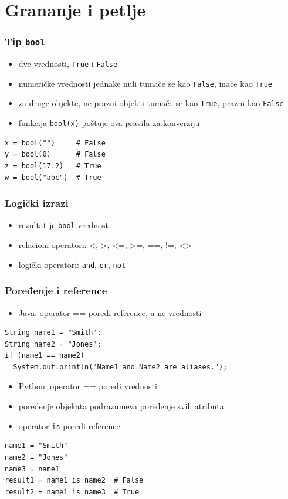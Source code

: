 \documentclass[compress]{beamer}
\begin{document}
\section[Kontrola toka]{Grananje i petlje}

\begin{frame}[fragile]
\frametitle{Tip \texttt{bool}}
\begin{itemize}
  \item dve vrednosti, \texttt{True} i \texttt{False}
  \item numeričke vrednosti jednake nuli tumače se kao \texttt{False}, inače kao \texttt{True}
  \item za druge objekte, ne-prazni objekti tumače se kao \texttt{True}, prazni kao \texttt{False}
  \item funkcija \texttt{bool(x)} poštuje ova pravila za konverziju
\end{itemize}
\begin{verbatim}
x = bool("")     # False
y = bool(0)      # False
z = bool(17.2)   # True
w = bool("abc")  # True
\end{verbatim}
\end{frame}

\begin{frame}[fragile]
\frametitle{Logički izrazi}
\begin{itemize}
  \item rezultat je \texttt{bool} vrednost
  \item relacioni operatori: <, >, <=, >=, ==, !=, <>
  \item logički operatori: \texttt{and}, \texttt{or}, \texttt{not}
\end{itemize}
\end{frame}

\begin{frame}[fragile]
\frametitle{Poređenje i reference}
\begin{itemize}
  \item Java: operator == poredi reference, a ne vrednosti
\end{itemize}
\begin{verbatim}
String name1 = "Smith";
String name2 = "Jones";
if (name1 == name2)
  System.out.println("Name1 and Name2 are aliases.");
\end{verbatim}
\begin{itemize}
  \item Python: operator == poredi vrednosti
  \item poređenje objekata podrazumeva poređenje svih atributa
  \item operator \texttt{is} poredi reference
\end{itemize}
\begin{verbatim}
name1 = "Smith"
name2 = "Jones"
name3 = name1
result1 = name1 is name2  # False
result2 = name1 is name3  # True
\end{verbatim}
\end{frame}
\end{document}
